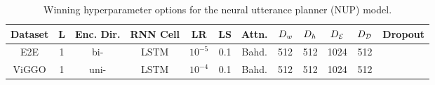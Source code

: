 \begin{table}
\centering
\begin{tabular}{c ccc ccc ccccc}
\toprule
Dataset & L & Enc. Dir. & RNN Cell& LR & LS & Attn. &$D_{w}$ & $D_{h}$  & ${D_\mathcal{E}}$ & ${D_\mathcal{D}}$ & Dropout \\
\midrule
   E2E & 1 & bi- &LSTM& $10^{-5}$ & 0.1 & Bahd. & 512 & 512 & 1024 & 512 &\\
   ViGGO & 1 & uni- & LSTM & $10^{-4}$ & 0.1 & Bahd.  & 512 & 512 & 1024 & 512 \\
\bottomrule
\end{tabular}
\caption{Winning hyperparameter options for the neural utterance planner (NUP)
model.}
\label{tab:nuphp}
\end{table}

